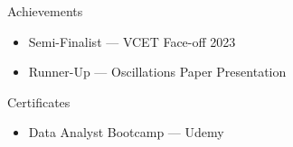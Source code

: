 \documentclass{resume}
\begin{document}
\begin{rSection}{Achievements}

\begin{itemize}
\itemsep -3pt
\item Semi-Finalist — VCET Face-off 2023
\item Runner-Up — Oscillations Paper Presentation
\end{itemize}

\end{rSection}

\begin{rSection}{Certificates}

\begin{itemize}
\itemsep -3pt
\item Data Analyst Bootcamp — Udemy
\end{itemize}

\end{rSection}
\end{document}

